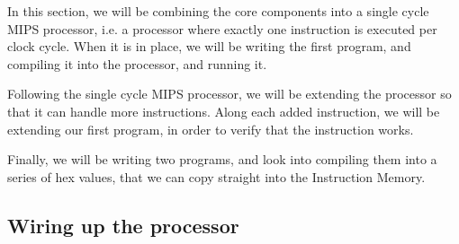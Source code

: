 In this section, we will be combining the core components into a single cycle
MIPS processor, i.e. a processor where exactly one instruction is executed per
clock cycle. When it is in place, we will be writing the first program, and
compiling it into the processor, and running it.

Following the single cycle MIPS processor, we will be extending
the processor so that it can handle more instructions. Along each added
instruction, we will be extending our first program, in order to verify that
the instruction works.

Finally, we will be writing two programs, and look into compiling them into a
series of hex values, that we can copy straight into the Instruction Memory.

\subsection{Wiring up the processor}
